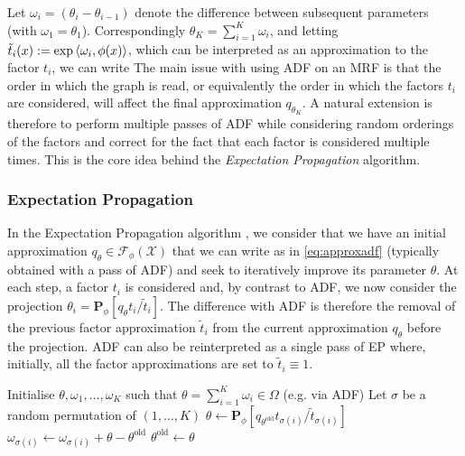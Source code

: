Let $\omega_{i}=(\theta_{i}-\theta_{i-1})$ denote the difference between subsequent parameters (with $\omega_{1}=\theta_{1}$). Correspondingly $\theta_{K}=\sum_{i=1}^{K}\omega_{i}$, and letting $\tilde t_{i}(x):=\exp\left\langle \omega_{i},\phi(x) \right\rangle$, which can be interpreted as an approximation to the factor $t_{i}$, we can write 
%
% 
The main issue with using ADF on an MRF is that the order in which the graph is read, or equivalently the order in which the factors $t_{i}$ are considered, will affect the final approximation $q_{\theta_{K}}$. A natural extension is therefore to perform multiple passes of ADF while considering random orderings of the factors and correct for the fact that each factor is considered multiple times. This is the core idea behind the \emph{Expectation Propagation} algorithm.
%
\subsubsection*{Expectation Propagation}
%
In the Expectation Propagation algorithm \citep{minka01, minka01b, seeger07, gelman14}, we consider that we have an initial approximation $q_{\theta}\in\mathcal F_{\phi}(\mathcal X)$ that we can write as in \eqref{eq:approxadf} (typically obtained with a pass of ADF) and seek to iteratively improve its parameter $\theta$. At each step, a factor $t_{i}$ is considered and, by contrast to ADF, we now consider the projection $\theta_{i}=\mathbf P_{\phi}[q_{\theta}t_{i}/\tilde t_{i}]$. The difference with ADF is therefore the removal of the previous factor approximation $\tilde t_{i}$ from the current approximation $q_{\theta}$ before the projection. ADF can also be reinterpreted as a single pass of EP where, initially, all the factor approximations are set to $\tilde t_{i}\equiv 1$.

\begin{algorithm}[!h]\small
	\caption{\label{alg:ep}}
	\begin{algorithmic}[1]
	\State Initialise $\theta,\omega_{1},\dots,\omega_{K}$ such that $\theta=\sum_{i=1}^{K}\omega_{i} \in \Omega$ (e.g. via ADF)
		\State Let $\sigma$ be a random permutation of $(1,\dots,K)$
    		\State $\theta \leftarrow \mathbf P_{\phi}[q_{\theta^{\text{old}}}t_{\sigma(i)}/\tilde t_{\sigma(i)}]$
    		\State $\omega_{\sigma(i)} \leftarrow \omega_{\sigma(i)} + \theta-\theta^{\text{old}}$
			\State $\theta^{\text{old}} \leftarrow \theta$
		\EndFor
	\EndFor\\	
	\Return{$\theta$}
	\end{algorithmic}
\end{algorithm} 


